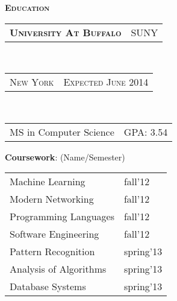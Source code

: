 \documentclass[10pt,a4paper,oneside]{article}
\begin{document}
    \hspace{2ex}
    \begin{minipage}[t]{0.33\textwidth}
        \vspace{0pt}
        \textcolor{light-gray}{\textbf{\large E\textsc{ducation}}}
        \vspace{10pt}\\
        \begin{tabular}{c|c}
            \textbf{\normalsize U\textsc{niversity} A\textsc{t} B\textsc{uffalo}}
            &\textmd{\normalsize SUNY}
        \end{tabular}\\
        \textcolor{light-gray}{
            \begin{tabular}{c|c}
                {\small N\textsc{ew} Y\textsc{ork}}
                &{\small E\textsc{xpected} J\textsc{une} 2014}
            \end{tabular}
        }\\ 
        \begin{tabular}{c|c}
            {\small MS in Computer Science}
            &{\small GPA: 3.54}
        \end{tabular}
        \vspace{0pt}
        \begin{adjustwidth}{7pt}{0pt}
            {\small \textbf{Coursework}: (Name/Semester)}\\
        \end{adjustwidth}
        \vspace{-11pt}
        \begin{adjustwidth}{7pt}{0pt}
            \begin{tabular}{ll}
                { \footnotesize Machine Learning } & {\footnotesize fall'12}\\                
                { \footnotesize Modern Networking } & {\footnotesize fall'12}\\
                { \footnotesize Programming Languages } & {\footnotesize fall'12}\\
                { \footnotesize Software Engineering } & {\footnotesize fall'12}\\
                { \footnotesize Pattern Recognition } & {\footnotesize spring'13}\\
                { \footnotesize Analysis of Algorithms } & {\footnotesize spring'13}\\
                { \footnotesize Database Systems } & {\footnotesize spring'13}\\

\end{tabular}
\end{adjustwidth}
\end{minipage}
\end{document}
